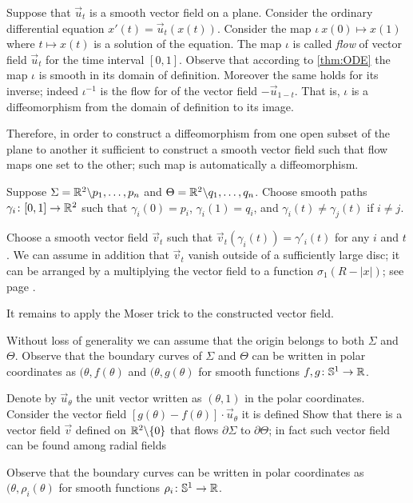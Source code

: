 Suppose that $\vec u_t$ is a smooth vector field on a plane.
Consider the ordinary differential equation $x'(t)=\vec u_t(x(t))$.
Consider the map $\iota\:x(0)\mapsto x(1)$ where $t\mapsto x(t)$ is a solution of the equation.
The map $\iota$ is called \emph{flow} of vector field $\vec u_t$ for the time interval $[0,1]$.
Observe that according to \ref{thm:ODE} the map $\iota$ is smooth in its domain of definition.
Moreover the same holds for its inverse;
indeed $\iota^{-1}$ is the flow for of the vector field $-\vec u_{1-t}$.
That is, $\iota$ is a diffeomorphism from the domain of definition to its image. 


Therefore, in order to construct a diffeomorphism from one open subset of the plane to another it sufficient to construct a smooth vector field such that flow maps one set to the other;
such map is automatically a diffeomorphism.


Suppose $\Sigma=\mathbb{R}^2\backslash{p_1,\dots,p_n}$ and $\Theta=\mathbb{R}^2\backslash{q_1,\dots,q_n}$.
Choose smooth paths $\gamma_i\colon[0,1]\to \mathbb{R}^2$ such that $\gamma_i(0)=p_i$,
$\gamma_i(1)=q_i$, and $\gamma_i(t)\ne \gamma_j(t)$ if $i\ne j$.

Choose a smooth vector field $\vec v_t$ such that $\vec v_t(\gamma_i(t))=\gamma'_i(t)$ for any $i$ and $t$.
We can assume in addition that $\vec v_t$ vanish outside of a sufficiently large disc; it can be arranged by a multiplying the vector field to a function 
$\sigma_1(R-|x|)$; see page \pageref{page:sigma-function}.

It remains to apply the Moser trick to the constructed vector field. 

Without loss of generality we can assume that the origin belongs to both $\Sigma$ and $\Theta$.
Observe that the boundary curves of $\Sigma$ and $\Theta$ can be written in polar coordinates as 
$(\theta, f(\theta)$ and $(\theta, g(\theta)$ for smooth functions $f,g\colon\mathbb{S}^1\to\mathbb{R}$.



Denote by $\vec u_\theta$ the unit vector written as $(\theta,1)$ in the polar coordinates.
Consider the vector field $[g(\theta)-f(\theta)]\cdot \vec u_\theta$ it is defined 
Show that there is a vector field $\vec v$ defined on $\mathbb{R}^2\backslash\{0\}$ that flows $\partial \Sigma$ to $\partial \Theta$;
in fact such vector field can be found among radial fields 


Observe that the boundary curves can be written in polar coordinates as 
$(\theta, \rho_i(\theta)$ for smooth functions $\rho_i\colon\mathbb{S}^1\to\mathbb{R}$.

